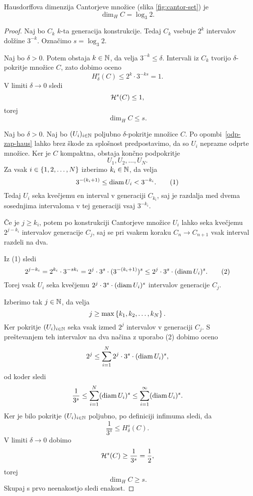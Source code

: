 \begin{trditev}
    Hausdorffova dimenzija Cantorjeve množice (slika \ref{fig:cantor-set}) je
    \[\dim_H C = \log_3 2.\]
\end{trditev}

\begin{proof}    
    Naj bo \(C_k\) \(k\)-ta generacija konstrukcije. Tedaj \(C_k\) vsebuje \(2^k\) intervalov dolžine \(3^{-k}\). Označimo \(s = \log_3 2\).

    Naj bo \(\delta > 0\). Potem obstaja \(k \in \mathbb{N}\), da velja \(3^{-k} \leq \delta\). Intervali iz \(C_k\) tvorijo \(\delta\)-pokritje množice \(C\), zato dobimo oceno
    \[H^s_\delta(C) \leq 2^k \cdot 3^{-ks} = 1.\]
    V limiti \(\delta \to 0\) sledi
    \[\mathcal{H}^s(C) \leq 1,\]
    torej 
    \[\dim_H C \leq s.\]

    Naj bo \(\delta > 0\). Naj bo \((U_i)_{i \in \mathbb{N}}\) poljubno \(\delta\)-pokritje množice \(C\). Po opombi~\ref{odp-zap-haus} lahko brez škode za splošnost predpostavimo, da so \(U_i\) neprazne odprte množice. Ker je \(C\) kompaktna, obstaja končno podpokritje 
    \[U_1, U_2, \ldots, U_N.\]
    Za vsak \(i \in \left\{1, 2, \ldots, N\right\}\) izberimo \(k_i \in \mathbb{N}\), da velja
    \[3^{-(k_i + 1)} \leq \operatorname{diam} U_i < 3^{-k_i}. \tag{1}\]
    Tedaj \(U_i\) seka kvečjemu en interval v generaciji \(C_{k_i}\), saj je razdalja med dvema sosednjima intervaloma v tej generaciji vsaj \(3^{-k_i}\).

    Če je \(j \geq k_i\), potem po konstrukciji Cantorjeve množice \(U_i\) lahko seka kvečjemu \(2^{j - k_i}\) intervalov generacije \(C_j\), saj se pri vsakem koraku \(C_n \to C_{n+1}\) vsak interval razdeli na dva.

    Iz (1) sledi
    \[2^{j - k_i} = 2^{k_i} \cdot 3^{-sk_i} = 2^j \cdot 3^s \cdot (3^{-(k_i+1)})^s \leq 2^j \cdot 3^s \cdot (\operatorname{diam} U_i)^s. \tag{2}\]
    Torej vsak \(U_i\) seka kvečjemu \(2^j \cdot 3^s \cdot (\operatorname{diam} U_i)^s\) intervalov generacije \(C_j\).

    Izberimo tak \(j \in \mathbb{N}\), da velja
    \[
    j \geq \max \left\{k_1, k_2, \ldots, k_N\right\}.
    \]
    Ker pokritje \((U_i)_{i \in \mathbb{N}}\) seka vsak izmed \(2^j\) intervalov v generaciji \(C_j\). S preštevanjem teh intervalov na dva načina z uporabo (2) dobimo oceno
    \[2^j \leq \sum_{i=1}^{N} 2^j \cdot 3^s \cdot (\operatorname{diam} U_i)^s,\]
    od koder sledi
    \[\frac{1}{3^s} \leq \sum_{i=1}^{N} (\operatorname{diam} U_i)^s \leq \sum_{i=1}^{\infty} (\operatorname{diam} U_i)^s.\]
    Ker je bilo pokritje \((U_i)_{i \in \mathbb{N}}\) poljubno, po definiciji infimuma sledi, da 
    \[\frac{1}{3^s} \leq H^s_\delta(C).\]
    V limiti \(\delta \to 0\) dobimo
    \[\mathcal{H}^s(C) \geq \frac{1}{3^s} = \frac{1}{2},\]
    torej 
    \[\dim_H C \geq s.\]
%
    Skupaj s prvo neenakostjo sledi enakost.
\end{proof}

